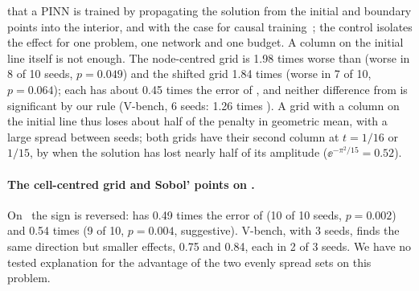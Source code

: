 \citet{daw2023} that a PINN is trained by propagating the solution from the initial and
boundary points into the interior, and with the case for causal
training~\citep{wangsankaran2024}; the control isolates the effect for one problem, one
network and one budget.
A column on the initial line itself is not enough. The node-centred grid  is
1.98 times worse than  (worse in 8 of 10 seeds, $p=0.049$) and the shifted grid
1.84 times (worse in 7 of 10, $p=0.064$); each has about 0.45 times the error of
, and neither difference from  is significant by our rule
(\textsf{V-bench}, 6 seeds:  1.26 times ). A grid with a column on
the initial line thus loses about half of the penalty in geometric mean, with a large spread
between seeds; both grids have their second column at $t=1/16$ or $1/15$, by when the solution
has lost nearly half of its amplitude ($\ee^{-\pi^2/15}=0.52$).

\paragraph{The cell-centred grid and Sobol' points on \PLtwo.}
On \PLtwo\ the sign is reversed:  has 0.49 times the error of
 (10 of 10 seeds, $p=0.002$) and  0.54 times (9 of 10,
$p=0.004$, suggestive). \textsf{V-bench}, with 3 seeds, finds the same direction but
smaller effects, 0.75 and 0.84, each in 2 of 3 seeds. We have no tested explanation for the
advantage of the two evenly spread sets on this problem.

